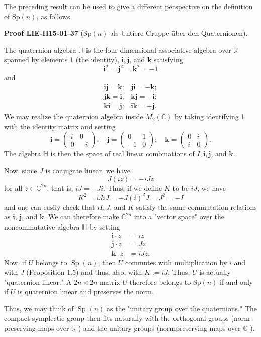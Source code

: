 \documentclass[10pt, letterpaper]{article}
\newcommand{\Sp}{\mathrm{Sp}}
\newcommand{\CustomHeading}[3]{%
  \par\medskip\noindent%
  \textbf{#1 #2} \textnormal{(#3)}.\enskip%
}
\newenvironment{PROOF}[2]{\begin{unitbox}\CustomHeading{Proof}{#1}{#2}}{\end{unitbox}}
\begin{document}
The preceding result can be used to give a different perspective on the definition of $\mathrm{Sp}(n)$, as follows. 


\begin{PROOF}{LIE-H15-01-37}{$\Sp(n)$ als Untiere Gruppe über den Quaternionen}
The quaternion algebra $\mathbb{H}$ is the four-dimensional associative algebra over $\mathbb{R}$ spanned by elements 1 (the identity), $\mathbf{i}, \mathbf{j}$, and $\mathbf{k}$ satisfying
$$
\mathbf{i}^{2}=\mathbf{j}^{2}=\mathbf{k}^{2}=-1
$$
and
$$
\begin{aligned}
\mathbf{i j}=\mathbf{k} ; & \mathbf{j i}=-\mathbf{k} ; \\
\mathbf{j k}=\mathbf{i} ; & \mathbf{k j}=-\mathbf{i} ; \\
\mathbf{k i}=\mathbf{j} ; & \mathbf{i k}=-\mathbf{j} .
\end{aligned}
$$
We may realize the quaternion algebra inside $M_{2}(\mathbb{C})$ by taking identifying 1 with the identity matrix and setting
$$
\mathbf{i}=\left(\begin{array}{rr}
i & 0 \\
0 & -i
\end{array}\right) ; \quad \mathbf{j}=\left(\begin{array}{rr}
0 & 1 \\
-1 & 0
\end{array}\right) ; \quad \mathbf{k}=\left(\begin{array}{cc}
0 & i \\
i & 0
\end{array}\right) .
$$
The algebra $\mathbb{H}$ is then the space of real linear combinations of $I, \mathbf{i}, \mathbf{j}$, and $\mathbf{k}$.


Now, since $J$ is conjugate linear, we have
$$
J(i z)=-i J z
$$
for all $z \in \mathbb{C}^{2 n}$; that is, $i J=-J i$. Thus, if we define $K$ to be $i J$, we have
$$
K^{2}=i J i J=-J(i)^{2} J=J^{2}=-I
$$
and one can easily check that $i I, J$, and $K$ satisfy the same commutation relations as $\mathbf{i}$, $\mathbf{j}$, and $\mathbf{k}$. We can therefore make $\mathbb{C}^{2 n}$ into a "vector space" over the noncommutative algebra $\mathbb{H}$ by setting
$$
\begin{aligned}
\mathbf{i} \cdot z & =i z \\
\mathbf{j} \cdot z & =J z \\
\mathbf{k} \cdot z & =i J z .
\end{aligned}
$$
Now, if $U$ belongs to $\operatorname{Sp}(n)$, then $U$ commutes with multiplication by $i$ and with $J$ (Proposition 1.5) and thus, also, with $K:=i J$. Thus, $U$ is actually "quaternion linear." A $2 n \times 2 n$ matrix $U$ therefore belongs to $\mathrm{Sp}(n)$ if and only if $U$ is quaternion linear and preserves the norm. 

Thus, we may think of $\operatorname{Sp}(n)$ as the "unitary group over the quaternions." The compact symplectic group then fits naturally with the orthogonal groups (norm-preserving maps over $\mathbb{R}$ ) and the unitary groups (normpreserving maps over $\mathbb{C}$ ).
\end{PROOF}
\end{document}
